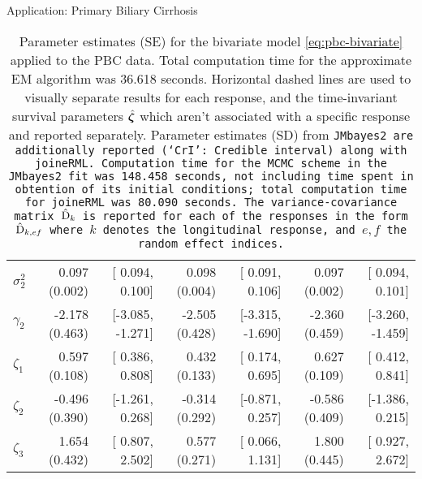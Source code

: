 \begin{chapter}{\label{cha:app-PBC}Application: Primary Biliary Cirrhosis}
\begin{table}[ht]
\begin{tabular}{lrrrrrr}
    $\sigma^2_2$ &  0.097 (0.002) & [ 0.094,  0.100] &  0.098 (0.004) & [ 0.091,  0.106] &  0.097 (0.002) & [ 0.094,  0.101] \\ 
    $\gamma_2$ & -2.178 (0.463) & [-3.085, -1.271] & -2.505 (0.428) & [-3.315, -1.690] & -2.360 (0.459) & [-3.260, -1.459] \\ 
    \hdashline
    $\zeta_1$ &  0.597 (0.108) & [ 0.386, 0.808] &  0.432 (0.133) & [ 0.174, 0.695] &  0.627 (0.109) & [ 0.412, 0.841] \\ 
    $\zeta_2$ & -0.496 (0.390) & [-1.261, 0.268] & -0.314 (0.292) & [-0.871, 0.257] & -0.586 (0.409) & [-1.386, 0.215] \\ 
    $\zeta_3$ &  1.654 (0.432) & [ 0.807, 2.502] &  0.577 (0.271) & [ 0.066, 1.131] &  1.800 (0.445) & [ 0.927, 2.672] \\ 
    \hline
  \end{tabular}
  \endgroup
  \caption{Parameter estimates (SE) for the bivariate model \eqref{eq:pbc-bivariate} applied to the PBC data. Total computation time for the approximate EM algorithm was 36.618 seconds. Horizontal dashed lines are used to visually separate results for each response, and the time-invariant survival parameters $\hat{\bm{\zeta}}$ which aren't associated with a specific response and reported separately. Parameter estimates (SD) from \tt{JMbayes2} are additionally reported (`CrI': Credible interval) along with \tt{joineRML}. Computation time for the MCMC scheme in the \tt{JMbayes2} fit was 148.458 seconds, not including time spent in obtention of its initial conditions; total computation time for \tt{joineRML} was 80.090 seconds. The variance-covariance matrix $\hat{\mathrm{D}}_k$ is reported for each of the responses in the form $\hat{\mathrm{D}}_{k,ef}$ where $k$ denotes the longitudinal response, and $e,f$ the random effect indices.}
  \label{tab:pbc-bivmodel}
  \end{table}


\end{chapter}
